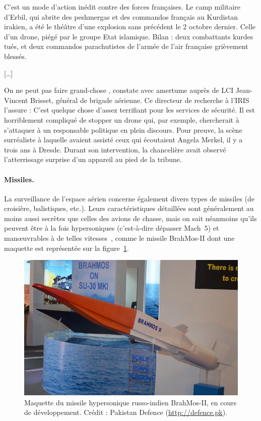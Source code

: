 	\begin{displayquote}
	C'est un mode d'action inédit contre des forces françaises. Le camp militaire d'Erbil, qui abrite des peshmergas et des commandos français au Kurdistan irakien, a été le théâtre d'une explosion sans précédent le 2 octobre dernier. Celle d'un drone, piégé par le groupe Etat islamique. Bilan : deux combattants kurdes tués, et deux commandos parachutistes de l'armée de l'air française grièvement blessés.
	
	[\ldots{}]
	
	\og On ne peut pas faire grand-chose \fg{}, constate avec amertume auprès de LCI Jean-Vincent Brisset, général de brigade aérienne. Ce directeur de recherche à l’IRIS l'assure : \og C'est quelque chose d'assez terrifiant pour les services de sécurité. Il est horriblement compliqué de stopper un drone qui, par exemple, chercherait à s'attaquer à un responsable politique en plein discours. \fg{} Pour preuve, la scène surréaliste à laquelle avaient assisté ceux qui écoutaient Angela Merkel, il y a trois ans à Dresde. Durant son intervention, la chancelière avait observé l’atterrissage surprise d’un appareil au pied de la tribune.~\cite{brisset}

	
	\end{displayquote}
	
	\paragraph{Missiles.}
	La surveillance de l'espace aérien concerne également divers types de missiles (de croisière, balistiques, etc.). Leurs caractéristiques détaillées sont généralement au moins aussi secrètes que celles des avions de chasse, mais on sait néanmoins qu'ils peuvent être à la fois hypersoniques (c'est-à-dire dépasser Mach~5) et manœuvrables à de telles vitesses~\cite{missiles}, comme le missile BrahMos-II dont une maquette est représentée sur la figure~\ref{fig:brahmos}.
	
	\begin{figure}[htb]
		\centering
		\includegraphics[width=\textwidth]{figures/ch1/brahmos-II}
		\caption{Maquette du missile hypersonique russo-indien BrahMos-II, en cours de développement. Crédit : Pakistan Defence (\url{http://defence.pk}).}
		\label{fig:brahmos}
	\end{figure}
	

